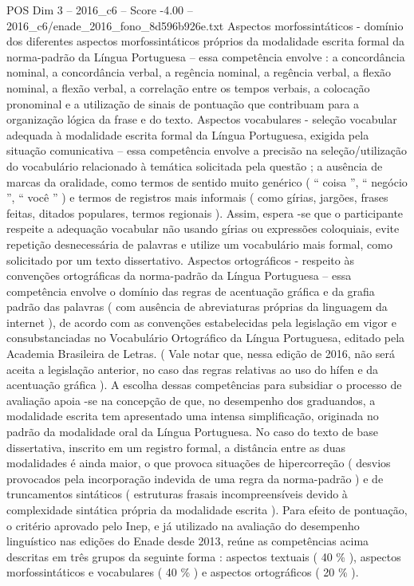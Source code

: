 \begin{textsample}{POS Dim 3 – 2016\_c6 – Score -4.00 – 2016\_c6/enade\_2016\_fono\_8d596b926e.txt}
Aspectos morfossintáticos - domínio dos diferentes aspectos morfossintáticos próprios da modalidade escrita formal da norma-padrão da Língua Portuguesa – essa competência envolve : a concordância nominal, a concordância verbal, a regência nominal, a regência verbal, a flexão nominal, a flexão verbal, a correlação entre os tempos verbais, a colocação pronominal e a utilização de sinais de pontuação que contribuam para a organização lógica da frase e do texto.
Aspectos vocabulares - seleção vocabular adequada à modalidade escrita formal da Língua Portuguesa, exigida pela situação comunicativa – essa competência envolve a precisão na seleção/utilização do vocabulário relacionado à temática solicitada pela questão ; a ausência de marcas da oralidade, como termos de sentido muito genérico ( “ coisa ”, “ negócio ”, “ você ” ) e termos de registros mais informais ( como gírias, jargões, frases feitas, ditados populares, termos regionais ).
Assim, espera -se que o participante respeite a adequação vocabular não usando gírias ou expressões coloquiais, evite repetição desnecessária de palavras e utilize um vocabulário mais formal, como solicitado por um texto dissertativo.
Aspectos ortográficos - respeito às convenções ortográficas da norma-padrão da Língua Portuguesa – essa competência envolve o domínio das regras de acentuação gráfica e da grafia padrão das palavras ( com ausência de abreviaturas próprias da linguagem da internet ), de acordo com as convenções estabelecidas pela legislação em vigor e consubstanciadas no Vocabulário Ortográfico da Língua Portuguesa, editado pela Academia Brasileira de Letras. ( Vale notar que, nessa edição de 2016, não será aceita a legislação anterior, no caso das regras relativas ao uso do hífen e da acentuação gráfica ).
A escolha dessas competências para subsidiar o processo de avaliação apoia -se na concepção de que, no desempenho dos graduandos, a modalidade escrita tem apresentado uma intensa simplificação, originada no padrão da modalidade oral da Língua Portuguesa.
No caso do texto de base dissertativa, inscrito em um registro formal, a distância entre as duas modalidades é ainda maior, o que provoca situações de hipercorreção ( desvios provocados pela incorporação indevida de uma regra da norma-padrão ) e de truncamentos sintáticos ( estruturas frasais incompreensíveis devido à complexidade sintática própria da modalidade escrita ).
Para efeito de pontuação, o critério aprovado pelo Inep, e já utilizado na avaliação do desempenho linguístico nas edições do Enade desde 2013, reúne as competências acima descritas em três grupos da seguinte forma : aspectos textuais ( 40 \% ), aspectos morfossintáticos e vocabulares ( 40 \% ) e aspectos ortográficos ( 20 \% ).

\end{textsample}
